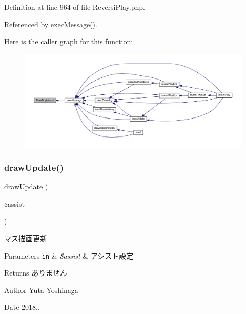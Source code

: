 Definition at line 964 of file Reversi\+Play.\+php.



Referenced by exec\+Message().

Here is the caller graph for this function\+:\nopagebreak
\begin{figure}[H]
\begin{center}
\leavevmode
\includegraphics[width=350pt]{class_reversi_play_af0649b9d4a899e0802c739928136de99_icgraph}
\end{center}
\end{figure}
\mbox{\label{class_reversi_play_a52029e5f2e049767d1f67c3f5c18ce9f}} 
\subsubsection{\texorpdfstring{draw\+Update()}{drawUpdate()}}
{\footnotesize\ttfamily draw\+Update (\begin{DoxyParamCaption}\item[{}]{\$assist }\end{DoxyParamCaption})}



マス描画更新 


\begin{DoxyParams}[1]{Parameters}
\mbox{\tt in}  & {\em \$assist} & アシスト設定 \\
\hline
\end{DoxyParams}
\begin{DoxyReturn}{Returns}
ありません 
\end{DoxyReturn}
\begin{DoxyAuthor}{Author}
Yuta Yoshinaga 
\end{DoxyAuthor}
\begin{DoxyDate}{Date}
2018.. 
\end{DoxyDate}


